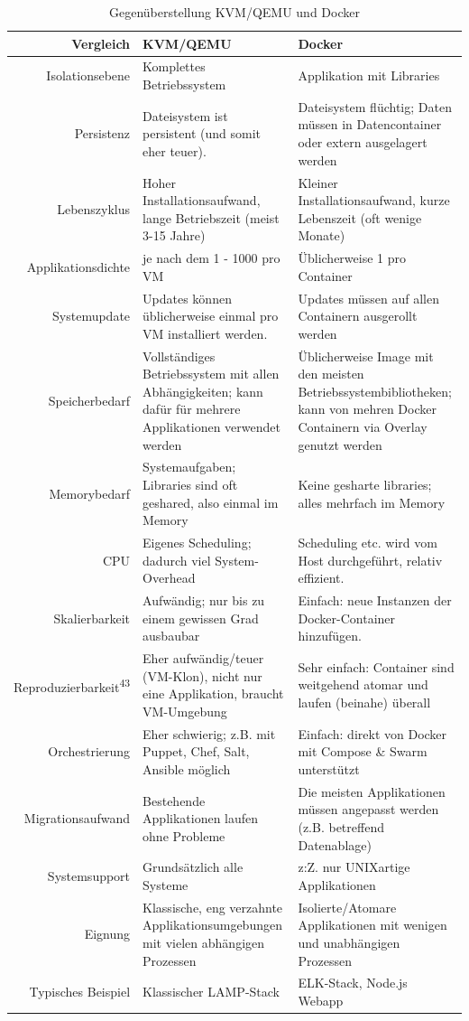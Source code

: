 \pagebreak
\begin{table}[H]
	\centering
	\begin{tabu} to \linewidth {r | X X}
		\toprule
		\textbf{Vergleich} & \textbf{KVM/QEMU} & \textbf{Docker} \\
		\midrule
		Isolationsebene & Komplettes Betriebssystem & Applikation mit Libraries \\ \hline
		Persistenz & Dateisystem ist persistent (und somit eher teuer). & Dateisystem flüchtig; Daten müssen in Datencontainer  oder extern ausgelagert werden \\ \hline
		Lebenszyklus & Hoher Installationsaufwand, lange Betriebszeit (meist 3-15 Jahre) & Kleiner Installationsaufwand, kurze Lebenszeit (oft wenige Monate) \\ \hline
		Applikationsdichte & je nach dem 1 - 1000 pro VM & Üblicherweise 1 pro Container \\ \hline
		Systemupdate & Updates können üblicherweise einmal pro VM installiert werden. & Updates müssen auf allen Containern ausgerollt werden \\ \hline
		Speicherbedarf & Vollständiges Betriebssystem mit allen Abhängigkeiten; kann dafür für mehrere Applikationen verwendet werden & Üblicherweise Image mit den meisten Betriebssystembibliotheken; kann von mehren Docker Containern via Overlay genutzt werden \\ \hline
		Memorybedarf & Systemaufgaben; Libraries sind oft geshared, also einmal im Memory & Keine gesharte libraries; alles mehrfach im Memory \\ \hline
		CPU & Eigenes Scheduling; dadurch viel System-Overhead & Scheduling etc. wird vom Host durchgeführt, relativ effizient. \\ \hline
		Skalierbarkeit & Aufwändig; nur bis zu einem gewissen Grad ausbaubar & Einfach: neue Instanzen der Docker-Container hinzufügen. \\ \hline
		Reproduzierbarkeit\textsuperscript{43} & Eher aufwändig/teuer (VM-Klon), nicht nur eine Applikation, braucht VM-Umgebung & Sehr einfach: Container sind weitgehend atomar und laufen (beinahe) überall\\ \hline
		Orchestrierung & Eher schwierig; z.B. mit Puppet, Chef, Salt, Ansible möglich & Einfach: direkt von Docker mit Compose \& Swarm unterstützt \\ \hline
		Migrationsaufwand & Bestehende Applikationen laufen ohne Probleme & Die meisten Applikationen müssen angepasst werden (z.B. betreffend Datenablage) \\ \hline
		Systemsupport & Grundsätzlich alle Systeme & z:Z. nur UNIXartige Applikationen \\ \hline
		Eignung & Klassische, eng verzahnte Applikationsumgebungen mit vielen abhängigen Prozessen & Isolierte/Atomare Applikationen mit wenigen und unabhängigen Prozessen \\ \hline
		Typisches Beispiel & Klassischer LAMP-Stack & ELK-Stack, Node.js Webapp \\
		\bottomrule
	\end{tabu}
	\caption{Gegenüberstellung KVM/QEMU und Docker}
	\label{tabu:kvm-docker}
\end{table}
\pagebreak


